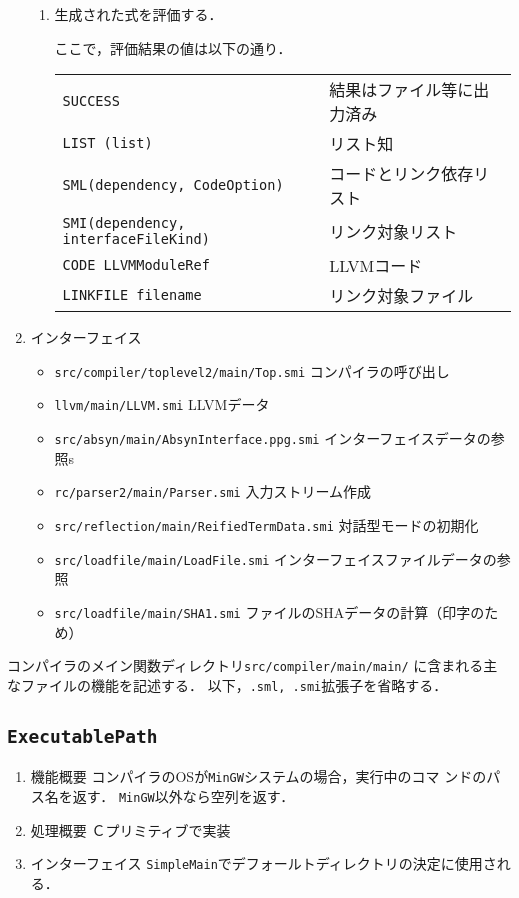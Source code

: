 \documentclass{jbook}
\newcommand{\code}[1]{\mbox{\large\tt #1}}
\begin{document}
\begin{enumerate}
\begin{enumerate}
\item 生成された式を評価する．

ここで，評価結果の値は以下の通り．

\begin{tabular}{ll}
\code{SUCCESS} & 結果はファイル等に出力済み
\\
\code{LIST (list)} & リスト知
\\
\code{SML(dependency, CodeOption)} & コードとリンク依存リスト
\\
\code{SMI(dependency, interfaceFileKind)} & リンク対象リスト
\\
\code{CODE LLVMModuleRef} & LLVMコード
\\
\code{LINKFILE filename} & リンク対象ファイル
\end{tabular}
\end{enumerate}

\item インターフェイス 
\begin{itemize}
\item \code{src/compiler/toplevel2/main/Top.smi} コンパイラの呼び出し
\item \code{llvm/main/LLVM.smi} LLVMデータ
\item \code{src/absyn/main/AbsynInterface.ppg.smi} インターフェイスデータの参照s
\item \code{rc/parser2/main/Parser.smi} 入力ストリーム作成
\item \code{src/reflection/main/ReifiedTermData.smi} 対話型モードの初期化
\item \code{src/loadfile/main/LoadFile.smi} インターフェイスファイルデータの参照
\item \code{src/loadfile/main/SHA1.smi} ファイルのSHAデータの計算（印字のため）
\end{itemize}
\end{enumerate}


\else%
	コンパイラのメイン関数ディレクトリ\code{src/compiler/main/main/}
に含まれる主なファイルの機能を記述する．
	以下，\code{.sml, .smi}拡張子を省略する．

\subsection{\code{ExecutablePath}}
\begin{enumerate}
\item 機能概要 コンパイラのOSが\code{MinGW}システムの場合，実行中のコマ
ンドのパス名を返す．
	\code{MinGW}以外なら空列を返す．
\item 処理概要 Ｃプリミティブで実装
\item インターフェイス \code{SimpleMain}でデフォールトディレクトリの決定に使用される．
\end{enumerate}
	
\end{document}
